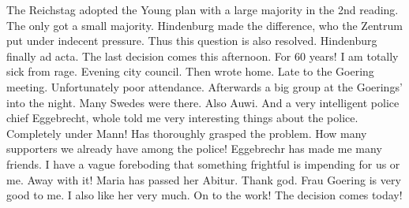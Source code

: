 The Reichstag adopted the Young plan with a large majority in the 2nd reading. The  only got a small majority. Hindenburg made the difference, who the Zentrum put under indecent pressure. Thus this question is also resolved. Hindenburg finally ad acta. The last decision comes this afternoon. For 60 years! I am totally sick from rage. Evening city council. Then wrote home. Late to the Goering meeting. Unfortunately poor attendance. Afterwards a big group at the Goerings' into the night. Many Swedes were there. Also Auwi. And a very intelligent police chief Eggebrecht, whole told me very interesting things about the police. Completely under Mann! Has thoroughly grasped the problem. How many supporters we already have among the police! Eggebrechr has made me many friends. I have a vague foreboding that something frightful is impending for us or me. Away with it! Maria has passed her Abitur. Thank god. Frau Goering is very good to me. I also like her very much. On to the work! The decision comes today!


